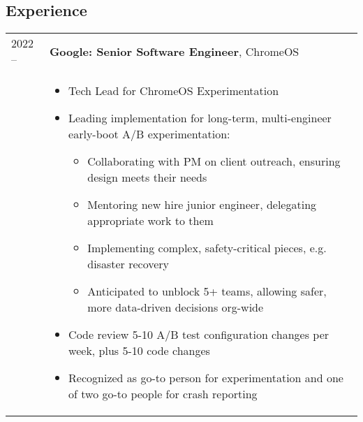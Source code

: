 \documentclass[overlapped]{res} \usepackage{hyperref}
\newcommand{\experience}[5]{
  \hspace{-9ex}
  \begin{tabular}{m{12ex} m{\textwidth}}
    #1 -- #2 & \textbf{#3}, #4 \\
    & #5
  \end{tabular}
  \vspace{-3ex}
}
\begin{document}

\address{
  \href{mailto:miriam@mutexlox.com}{miriam@mutexlox.com} \\
}
\address{  %
  \hfill \href{https://mutexlox.com}{https://mutexlox.com} \\
}

\begin{resume}


\section{Experience}
  \vspace{0.5ex}

  \experience{2022}{}{Google: Senior Software Engineer}{ChromeOS}{
    \begin{itemize} \itemsep -1pt
        \item Tech Lead for ChromeOS Experimentation
        \item Leading implementation for long-term, multi-engineer early-boot
          A/B experimentation:
          \vspace{-0.5em}
          \begin{itemize} \itemsep -1pt
              \item Collaborating with PM on client outreach, ensuring
                design meets their needs
              \item Mentoring new hire junior engineer, delegating appropriate
                work to them
              \item Implementing complex, safety-critical pieces, e.g.
                disaster recovery
              \item Anticipated to unblock 5+ teams, allowing safer, more
                data-driven decisions org-wide
          \end{itemize}
        \item Code review 5-10 A/B test configuration changes per week, plus 5-10
          code changes
        \item Recognized as go-to person for experimentation and one of two
          go-to people for crash reporting
    \end{itemize}}


\end{resume}
\end{document}
